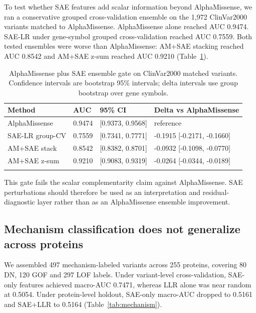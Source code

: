 \documentclass[pdflatex,sn-nature]{sn-jnl}
\begin{document}
To test whether SAE features add scalar information beyond AlphaMissense, we ran a conservative grouped cross-validation ensemble on the 1,972 ClinVar2000 variants matched to AlphaMissense. AlphaMissense alone reached AUC 0.9474. SAE-LR under gene-symbol grouped cross-validation reached AUC 0.7559. Both tested ensembles were worse than AlphaMissense: AM+SAE stacking reached AUC 0.8542 and AM+SAE z-sum reached AUC 0.9210 (Table~\ref{tab:amensemble}).

\begin{table}[h]
\caption{AlphaMissense plus SAE ensemble gate on ClinVar2000 matched variants. Confidence intervals are bootstrap 95\% intervals; delta intervals use group bootstrap over gene symbols.}\label{tab:amensemble}
\begin{tabular}{@{}llll@{}}
\toprule
Method & AUC & 95\% CI & Delta vs AlphaMissense \\
\midrule
AlphaMissense & 0.9474 & [0.9373, 0.9568] & reference \\
SAE-LR group-CV & 0.7559 & [0.7341, 0.7771] & -0.1915 [-0.2171, -0.1660] \\
AM+SAE stack & 0.8542 & [0.8382, 0.8701] & -0.0932 [-0.1098, -0.0770] \\
AM+SAE z-sum & 0.9210 & [0.9083, 0.9319] & -0.0264 [-0.0344, -0.0189] \\
\botrule
\end{tabular}
\end{table}

This gate fails the scalar complementarity claim against AlphaMissense. SAE perturbations should therefore be used as an interpretation and residual-diagnostic layer rather than as an AlphaMissense ensemble improvement.

\subsection{Mechanism classification does not generalize across proteins}

We assembled 497 mechanism-labeled variants across 255 proteins, covering 80 DN, 120 GOF and 297 LOF labels. Under variant-level cross-validation, SAE-only features achieved macro-AUC 0.7471, whereas LLR alone was near random at 0.5054. Under protein-level holdout, SAE-only macro-AUC dropped to 0.5161 and SAE+LLR to 0.5164 (Table~\ref{tab:mechanism}).
\end{document}
